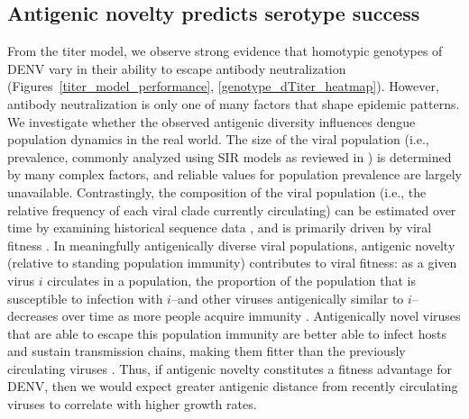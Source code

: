 \documentclass[11pt,oneside,letterpaper]{article}
\begin{document}
\subsection*{Antigenic novelty predicts serotype success}
From the titer model, we observe strong evidence that homotypic genotypes of DENV vary in their ability to escape antibody neutralization (Figures~\ref{titer_model_performance}, \ref{genotype_dTiter_heatmap}).
However, antibody neutralization is only one of many factors that shape epidemic patterns.
We investigate whether the observed antigenic diversity influences dengue population dynamics in the real world.
The size of the viral population (i.e., prevalence, commonly analyzed using SIR models as reviewed in \citep{lourencco2018challenges}) is determined by many complex factors, and reliable values for population prevalence are largely unavailable.
Contrastingly, the composition of the viral population (i.e., the relative frequency of each viral clade currently circulating) can be estimated over time by examining historical sequence data \citep{lee2018deep,neher2016prediction}, and is primarily driven by viral fitness \citep{bedford2011strength}.
In meaningfully antigenically diverse viral populations, antigenic novelty (relative to standing population immunity) contributes to viral fitness: as a given virus $i$ circulates in a population, the proportion of the population that is susceptible to infection with $i$--and other viruses antigenically similar to $i$--decreases over time as more people acquire immunity \citep{bedford2012canalization, luksza2014predictive}.
Antigenically novel viruses that are able to escape this population immunity are better able to infect hosts and sustain transmission chains, making them fitter than the previously circulating viruses \citep{zhang2005clade, bedford2012canalization}.
Thus, if antigenic novelty constitutes a fitness advantage for DENV, then we would expect greater antigenic distance from recently circulating viruses to correlate with higher growth rates.
\end{document}
